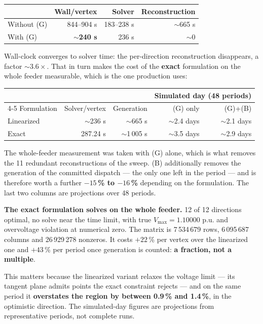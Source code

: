 \documentclass[11pt,a4paper]{article}
\newcommand{\nw}[1]{\textcolor{uaired}{#1}}
\begin{document}
\begin{center}\small
\begin{tabular}{l r r r}
\toprule
& \textbf{Wall/vertex} & \textbf{Solver} & \textbf{Reconstruction} \\
\midrule
Without \nw{(G)} & 844--904 s & 183--238 s & $\sim$665 s \\
With \nw{(G)}    & \textbf{$\sim$240 s} & 236 s & \nw{$\sim$0} \\
\bottomrule
\end{tabular}
\end{center}

Wall-clock converges to solver time: the per-direction reconstruction disappears, a factor
$\sim3.6\times$. That in turn makes the cost of the \textbf{exact} formulation on the whole feeder
measurable, which is the one production uses:

\begin{center}\small
\begin{tabular}{l r r r r}
\toprule
& & & \multicolumn{2}{c}{\textbf{Simulated day (48 periods)}}\\
\cmidrule(l){4-5}
Formulation & Solver/vertex & Generation & \nw{(G)} only & \nw{(G)}+\nw{(B)} \\
\midrule
Linearized & $\sim$236 s & $\sim$665 s & $\sim$2.4 days & $\sim$2.1 days \\
\nw{Exact} & \nw{287.24 s} & \nw{$\sim$1\,005 s} & \nw{$\sim$3.5 days} & \nw{$\sim$2.9 days} \\
\bottomrule
\end{tabular}
\end{center}

\vspace{-1mm}
The whole-feeder measurement was taken with \nw{(G)} alone, which is what removes the 11 redundant
reconstructions of the sweep. \nw{(B)} additionally removes the generation of the committed dispatch
--- the only one left in the period --- and is therefore worth a further \textbf{$-15$\,\% to
$-16$\,\%} depending on the formulation. The last two columns are projections over 48 periods.

\begin{keybox}
\textbf{\nw{The exact formulation solves on the whole feeder.}} 12 of 12 directions optimal, no solve
near the time limit, with true $V_{\max}=1.10000$ p.u. and overvoltage violation at numerical zero.
The matrix is 7\,534\,679 rows, 6\,095\,687 columns and 26\,929\,278 nonzeros. It costs $+22$\,\% per
vertex over the linearized one and $+43$\,\% per period once generation is counted: \textbf{a
fraction, not a multiple}.

This matters because the linearized variant relaxes the voltage limit --- its tangent plane admits
points the exact constraint rejects --- and on the same period it \textbf{overstates the region by
between 0.9\,\% and 1.4\,\%}, in the optimistic direction. The simulated-day figures are projections
from representative periods, not complete runs.
\end{keybox}
\end{document}

